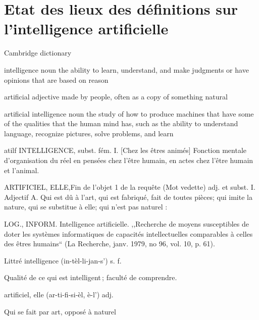 \section{Etat des lieux des définitions sur l'intelligence artificielle}
Cambridge dictionary


intelligence
noun
the ability to learn, understand, and make judgments or have opinions that are based on reason

artificial
adjective
made by people, often as a copy of something natural

artificial intelligence
noun
the study of how to produce machines that have some of the qualities that the human mind has, such as the ability to understand language, recognize pictures, solve problems, and learn


atilf
INTELLIGENCE, subst. fém.
I. [Chez les êtres animés] Fonction mentale d'organisation du réel en pensées chez l'être humain, en actes chez l'être humain et l'animal.

ARTIFICIEL, ELLE,Fin de l'objet 1 de la requête (Mot vedette) adj. et subst.
I. Adjectif
A. Qui est dû à l'art, qui est fabriqué, fait de toutes pièces; qui imite la nature, qui se substitue à elle; qui n'est pas naturel :

LOG., INFORM. Intelligence artificielle. ,,Recherche de moyens susceptibles de doter les systèmes informatiques de capacités intellectuelles comparables à celles des êtres humains`` (La Recherche, janv. 1979, no 96, vol. 10, p. 61).


Littré
intelligence
(in-tèl-li-jan-s') s. f.

Qualité de ce qui est intelligent ; faculté de comprendre.

artificiel, elle
(ar-ti-fi-si-èl, è-l') adj.

Qui se fait par art, opposé à naturel

\pagebreak
